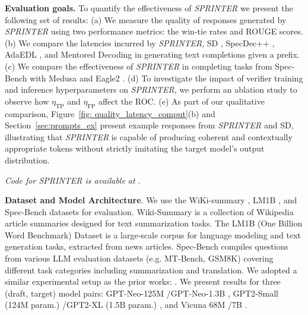 \documentclass{article}
\newcommand{\revision}[1]{{\color{black} #1}}
\theoremstyle{plain}
\theoremstyle{definition}
\theoremstyle{remark}
\begin{document}
\textbf{Evaluation goals.} To quantify the effectiveness of \textit{SPRINTER} we present the following set of results: (a) We measure the quality of responses generated by \textit{SPRINTER} using two performance metrics: the win-tie rates and ROUGE scores.  \revision{(b) We compare the latencies incurred by \textit{SPRINTER}, SD \cite{leviathan2023fast}, SpecDec++ \cite{huang2024specdec++}, AdaEDL \cite{agrawal2024adaedl}, and Mentored Decoding \cite{tranthien2024mentored} in generating text completions given a prefix. (c) We compare the effectiveness of \textit{SPRINTER} in completing tasks from Spec-Bench \cite{xia-etal-2024-unlocking} with  Medusa \cite{cai2024medusa} and Eagle2 \cite{li2406eagle}.} (d) To investigate the impact of verifier training and inference hyperparameters on \textit{SPRINTER}, we perform an ablation study to observe how $\eta_\text{TP}$ and $\eta_\text{FP}$ affect the ROC. (e)  As part of our qualitative comparison, Figure~\ref{fig: quality_latency_comput}(b) and Section~\ref{sec:prompts_ex} present example responses from \textit{SPRINTER} and SD, illustrating that \textit{SPRINTER} is capable of producing coherent and contextually appropriate tokens without strictly imitating the target model’s output distribution.

\textit{Code for \textit{SPRINTER} is available at \cite{codesprinter}}.


\textbf{Dataset and Model Architecture}. 
\revision{We use the WiKi-summary \cite{scheepers2018improving}, LM1B \cite{chelba2013one}, and Spec-Bench  \cite{xia-etal-2024-unlocking} datasets for evaluation.  Wiki-Summary is a collection of Wikipedia article summaries designed for text summarization tasks. 
The LM1B (One Billion Word Benchmark) Dataset is a large-scale corpus for language modeling and text generation tasks, extracted from news articles. Spec-Bench compiles questions from various LLM evaluation datasets (e.g. MT-Bench, GSM8K) covering different task categories including summarization and translation. We adopted a similar experimental setup as the prior works: \cite{github_specdec,chakraborty2024transferqstarprincipled}. We present results for three (draft, target) model pairs: GPT-Neo-125M \cite{GPT-Neo-125m}/GPT-Neo-1.3B \cite{GPT-Neo-1.3b}, GPT2-Small (124M param.) \cite{GPT2}/GPT2-XL (1.5B param.) \cite{GPT2-XL}, and Vicuna 68M \cite{Vicuna68m}/7B \cite{Vicuna7b}.} 
\end{document}
